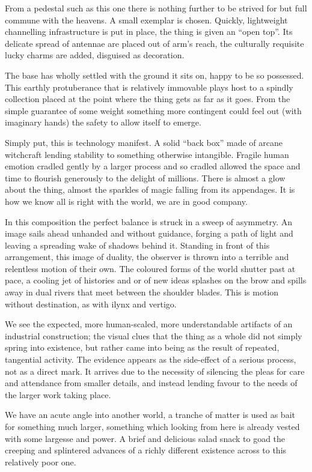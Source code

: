 \documentclass{book}
\begin{document}
From a pedestal such as this one there is nothing further to be strived for but
full commune with the heavens. A small exemplar is chosen. Quickly, lightweight
channelling infrastructure is put in place, the thing is given an ``open top''.
Its delicate spread of antennae are placed out of arm's reach, the culturally
requisite lucky charms are added, disguised as decoration.

The base has wholly settled with the ground it sits on, happy to be so
possessed. This earthly protuberance that is relatively immovable plays host to
a spindly collection placed at the point where the thing gets as far as it
goes. From the simple guarantee of some weight something more contingent could
feel out (with imaginary hands) the safety to allow itself to emerge.

Simply put, this is technology manifest. A solid ``back box'' made of arcane
witchcraft lending stability to something otherwise intangible. Fragile human
emotion cradled gently by a larger process and so cradled allowed the space and
time to flourish generously to the delight of millions. There is almost a glow
about the thing, almost the sparkles of magic falling from its appendages. It
is how we know all is right with the world, we are in good company.

In this composition the perfect balance is struck in a sweep of asymmetry. An
image sails ahead unhanded and without guidance, forging a path of light and
leaving a spreading wake of shadows behind it. Standing in front of this
arrangement, this image of duality, the observer is thrown into a terrible and
relentless motion of their own. The coloured forms of the world shutter past at
pace, a cooling jet of histories and or of new ideas splashes on the brow and
spills away in dual rivers that meet between the shoulder blades. This is
motion without destination, as with ilynx and vertigo.

We see the expected, more human-scaled, more understandable artifacts of an
industrial construction; the visual clues that the thing as a whole did not
simply spring into existence, but rather came into being as the result of
repeated, tangential activity. The evidence appears as the side-effect of a
serious process, not as a direct mark. It arrives due to the necessity of
silencing the pleas for care and attendance from smaller details, and instead
lending favour to the needs of the larger work taking place.

We have an acute angle into another world, a tranche of matter is used as bait
for something much larger, something which looking from here is already vested
with some largesse and power. A brief and delicious salad snack to goad the
creeping and splintered advances of a richly different existence across to this
relatively poor one.
\end{document}
